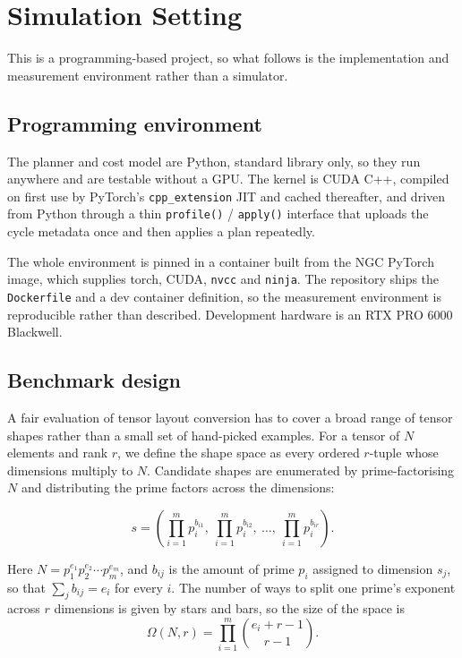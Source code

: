 \section{Simulation Setting}
\label{sec:setting}

This is a programming-based project, so what follows is the implementation and
measurement environment rather than a simulator.

\subsection{Programming environment}

The planner and cost model are Python, standard library only, so they run
anywhere and are testable without a GPU. The kernel is CUDA C++, compiled on
first use by PyTorch's \texttt{cpp\_extension} JIT and cached thereafter, and
driven from Python through a thin \texttt{profile()} / \texttt{apply()}
interface that uploads the cycle metadata once and then applies a plan
repeatedly.

The whole environment is pinned in a container built from the NGC PyTorch
image, which supplies torch, CUDA, \texttt{nvcc} and \texttt{ninja}. The
repository ships the \texttt{Dockerfile} and a dev container definition, so
the measurement environment is reproducible rather than described. Development
hardware is an RTX PRO 6000 Blackwell.

\subsection{Benchmark design}
\label{sec:benchmark}

A fair evaluation of tensor layout conversion has to cover a broad range of
tensor shapes rather than a small set of hand-picked examples. For a tensor of
$N$ elements and rank $r$, we define the shape space as every ordered
$r$-tuple whose dimensions multiply to $N$. Candidate shapes are enumerated by
prime-factorising $N$ and distributing the prime factors across the
dimensions:

\begin{equation}
s = \left(\prod_{i=1}^m p_i^{b_{i1}},\ \prod_{i=1}^m p_i^{b_{i2}},\ \ldots,\
\prod_{i=1}^m p_i^{b_{ir}}\right).
\label{eq:shapes}
\end{equation}

Here $N = p_1^{e_1} p_2^{e_2} \cdots p_m^{e_m}$, and $b_{ij}$ is the amount of
prime $p_i$ assigned to dimension $s_j$, so that
$\sum_{j} b_{ij} = e_i$ for every $i$. The number of ways to split one prime's
exponent across $r$ dimensions is given by stars and bars, so the size of the
space is
\begin{equation}
\Omega(N,r) = \prod_{i=1}^m \binom{e_i + r - 1}{\,r - 1\,}.
\label{eq:omega}
\end{equation}


